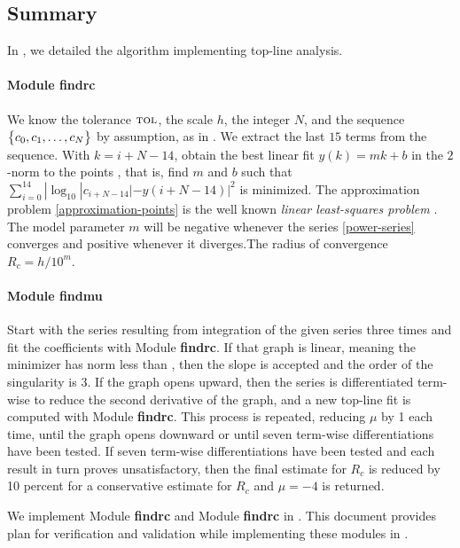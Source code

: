 \documentclass[12pt, titlepage]{article}
\begin{document}
\subsection{Summary}

In \cite{SRS}, we detailed the algorithm implementing top-line analysis.

\paragraph{Module findrc} \label{findrc}
We know the tolerance $\text{\sc tol}$, the scale $h$, the integer $N$, and the sequence
$\bigl\{ {c_0, c_1, \ldots, c_{N}} \bigr\}$ by assumption, as in .
We extract the last $15$ terms from the sequence.
With $k = i+N-14$, obtain the best linear fit $y(k) = m k + b$ in the $2$-norm to the points
\EQ
{
  \label{eq:approximation-points}
  ,
}
that is, find $m$ and $b$ such that $\sum_{i=0}^{14} |\log_{10} |c_{i+N-14}| - y(i+N-14)|^2$ is minimized.
The approximation problem \eqref{approximation-points} is the well known
{\it linear least-squares problem} \cite{GoVL89}.
The model parameter $m$ will be negative whenever the series \eqref{power-series} converges and
positive whenever it diverges.The radius of convergence $R_c = h/10^m$.

\paragraph{Module findmu}
Start with the series resulting from integration of the given series three times and
fit the coefficients with Module {\bf findrc}. If that graph is linear, meaning the
minimizer has norm less than \tol, then the slope is accepted and the order of the
singularity is 3. If the graph opens upward, then the series is differentiated term-wise
to reduce the second derivative of the graph, and a new top-line fit is computed with
Module {\bf findrc}. This process is repeated, reducing $\mu$ by 1 each time, until the
graph opens downward or until seven term-wise differentiations have been tested.
If seven term-wise differentiations have been tested and each result in turn proves
unsatisfactory, then the final estimate for $R_c$ is reduced by 10 percent for a
conservative estimate for $R_c$ and $\mu=-4$ is returned.

We implement Module {\bf findrc} and Module {\bf findrc} in .
This document provides plan for verification and validation  while implementing
these modules in \cpp.
\end{document}
